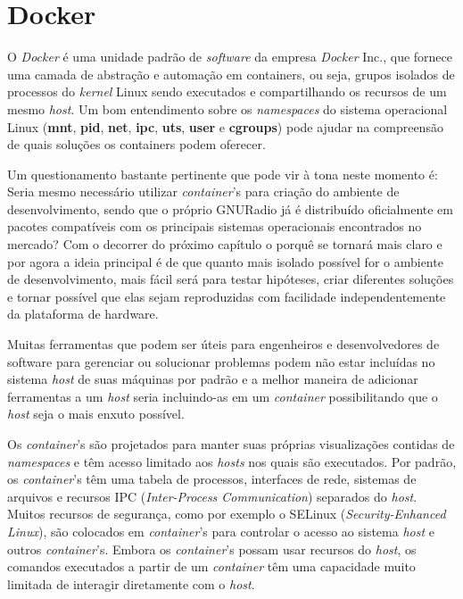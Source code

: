 \documentclass[
  12pt,				%
  openright,			%
  twoside,			%
  a4paper,			%
  english,			%
  french,				%
  spanish,			%
  brazil,				%
  ]{abntex2}
\begin{document}
\newpage
\section*{Docker}

O \textit{Docker} é uma unidade padrão de \textit{software} da empresa \textit{Docker} Inc., que fornece uma camada de abstração e automação em containers, ou seja, grupos isolados de
processos do \textit{kernel} Linux sendo executados e compartilhando os recursos de um mesmo \textit{host}. Um bom entendimento sobre os \textit{namespaces} do  sistema operacional
Linux (\textbf{mnt}, \textbf{pid}, \textbf{net}, \textbf{ipc}, \textbf{uts}, \textbf{user} e \textbf{cgroups}) pode ajudar na compreensão de quais soluções os
containers podem oferecer.

Um questionamento bastante pertinente que pode vir à tona neste momento é: Seria mesmo necessário utilizar \textit{container}'s para criação
do ambiente de desenvolvimento, sendo que o próprio GNURadio já é distribuído oficialmente em pacotes compatíveis com os principais sistemas
operacionais encontrados no mercado? Com o decorrer do próximo capítulo o porquê se tornará mais claro e por agora a ideia principal é de
que quanto mais isolado possível for o ambiente de desenvolvimento, mais fácil será para testar hipóteses, criar diferentes soluções e tornar
possível que elas sejam reproduzidas com facilidade independentemente da plataforma de hardware.

Muitas ferramentas que podem ser úteis para engenheiros e desenvolvedores de software para gerenciar ou solucionar problemas podem não estar
incluídas no sistema \textit{host} de suas máquinas por padrão e a melhor maneira de adicionar ferramentas a um \textit{host} seria
incluindo-as em um \textit{container} possibilitando que o \textit{host} seja o mais enxuto possível.

Os \textit{container}'s são projetados para manter suas próprias visualizações contidas de \textit{namespaces} e têm acesso limitado aos \textit{hosts} nos quais
são executados. Por padrão, os \textit{container}'s têm uma tabela de processos, interfaces de rede, sistemas de arquivos e recursos IPC
(\textit{Inter-Process Communication}) separados do \textit{host}.
Muitos recursos de segurança, como por exemplo o SELinux (\textit{Security-Enhanced Linux}), são colocados em \textit{container}'s para controlar o acesso ao sistema \textit{host} e outros
\textit{container}'s. Embora os \textit{container}'s possam usar recursos do \textit{host}, os comandos executados a partir de um \textit{container} têm uma capacidade muito
limitada de interagir diretamente com o \textit{host}.
\end{document}
